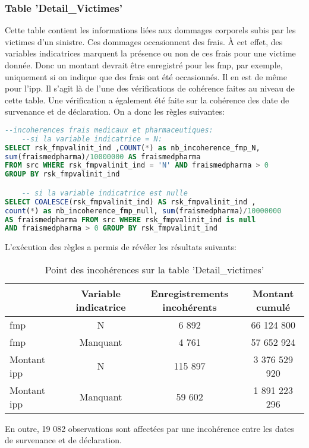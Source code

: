\subsubsection{\textbf{Table 'Detail\_Victimes'}} 
Cette table contient les informations li\'ees aux dommages corporels subis par les victimes d'un sinistre. Ces dommages occasionnent des frais. \`A cet effet, des variables indicatrices marquent la pr\'esence ou non de ces frais pour une victime donn\'ee. Donc un montant devrait \^etre enregistr\'e pour les \acrfull{fmp}, par exemple, uniquement si on indique que des frais ont \'et\'e occasionn\'es. Il en est de m\^eme pour l'\acrfull{ipp}. Il s'agit l\`a de l'une des v\'erifications de coh\'erence faites au niveau de cette table. Une v\'erification a \'egalement \'et\'e faite sur la coh\'erence des date de survenance et de d\'eclaration. On a donc les r\`egles suivantes:
\begin{lstlisting}[language=SQL,caption={R\`egle de la Dimension Coh\'erence pour la table \textit{Detail\_Victimes}},captionpos=b,showspaces=false,basicstyle=\scriptsize,numbers=none,commentstyle=\color{gray},backgroundcolor=\color{background}]
--incoherences frais medicaux et pharmaceutiques: 
	--si la variable indicatrice = N:
SELECT rsk_fmpvalinit_ind ,COUNT(*) as nb_incoherence_fmp_N, 
sum(fraismedpharma)/10000000 AS fraismedpharma 
FROM src WHERE rsk_fmpvalinit_ind = 'N' AND fraismedpharma > 0 
GROUP BY rsk_fmpvalinit_ind

	-- si la variable indicatrice est nulle
SELECT COALESCE(rsk_fmpvalinit_ind) AS rsk_fmpvalinit_ind , 
count(*) as nb_incoherence_fmp_null, sum(fraismedpharma)/10000000 
AS fraismedpharma FROM src WHERE rsk_fmpvalinit_ind is null 
AND fraismedpharma > 0 GROUP BY rsk_fmpvalinit_ind
\end{lstlisting}
L'ex\'ecution des r\`egles a permis de r\'ev\'eler les r\'esultats suivants: 

\begin{table}[H]
\caption{Point des incoh\'erences sur la table 'Detail\_victimes'}
\vspace{0.5cm}
\begin{tabular}{llccc}
\toprule 
&& Variable indicatrice & Enregistrements incoh\'erents & Montant cumul\'e  \\
\midrule
\acrshort{fmp} && N & 6 892 & 66 124 800 \\ 
\acrshort{fmp} && Manquant & 4 761 & 57 652 924\\ 
Montant \acrshort{ipp} && N & 115 897 & 3 376 529 920 \\
Montant \acrshort{ipp} && Manquant & 59 602 & 1 891 223 296  \\
\bottomrule
\end{tabular}
\end{table}
En outre, 19 082 observations sont affect\'ees par une incoh\'erence entre les dates de survenance et de d\'eclaration.